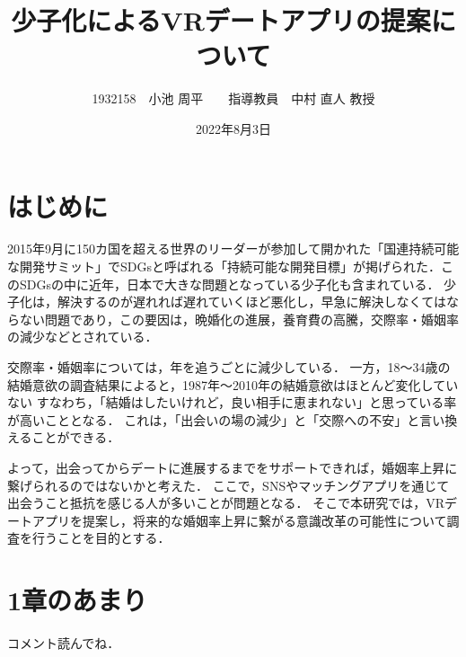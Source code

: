 \documentclass[12pt]{ltjsarticle}
\title{少子化によるVRデートアプリの提案について}
\author{1932158　小池 周平　　指導教員　中村 直人 教授}
\date{2022年8月3日}
\begin{document}
\maketitle

\section{はじめに}



2015年9月に150カ国を超える世界のリーダーが参加して開かれた「国連持続可能な開発サミット」でSDGsと呼ばれる「持続可能な開発目標」が掲げられた．このSDGsの中に近年，日本で大きな問題となっている少子化も含まれている．
少子化は，解決するのが遅れれば遅れていくほど悪化し，早急に解決しなくてはならない問題であり，この要因は，晩婚化の進展，養育費の高騰，交際率・婚姻率の減少などとされている．





交際率・婚姻率については，年を追うごとに減少している．
一方，18〜34歳の結婚意欲の調査結果によると，1987年〜2010年の結婚意欲はほとんど変化していない
すなわち，「結婚はしたいけれど，良い相手に恵まれない」と思っている率が高いこととなる．
これは，「出会いの場の減少」と「交際への不安」と言い換えることができる．

よって，出会ってからデートに進展するまでをサポートできれば，婚姻率上昇に繋げられるのではないかと考えた．
ここで，SNSやマッチングアプリを通じて出会うこと抵抗を感じる人が多いことが問題となる．
そこで本研究では，VRデートアプリを提案し，将来的な婚姻率上昇に繋がる意識改革の可能性について調査を行うことを目的とする．

\section{1章のあまり}
コメント読んでね．
\end{document}
